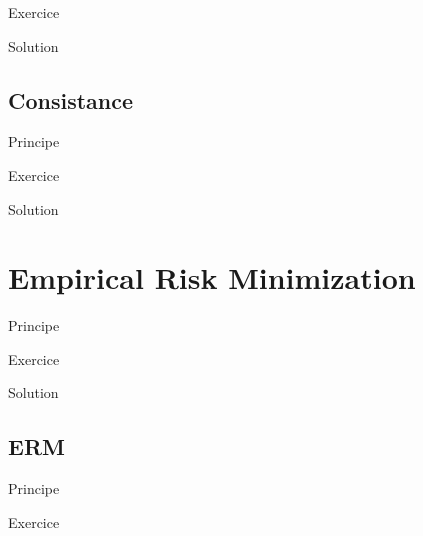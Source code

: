 \documentclass[11pt]{beamer}
\begin{document}
\begin{frame}{Exercice}

\end{frame}

\begin{frame}{Solution}

\end{frame}

\subsection{Consistance}

\begin{frame}{Principe}

\end{frame}

\begin{frame}{Exercice}

\end{frame}

\begin{frame}{Solution}

\end{frame}

\section{Empirical Risk Minimization}

\begin{frame}{Principe}

\end{frame}

\begin{frame}{Exercice}

\end{frame}

\begin{frame}{Solution}

\end{frame}

\subsection{ERM}

\begin{frame}{Principe}

\end{frame}

\begin{frame}{Exercice}

\end{frame}
\end{document}
